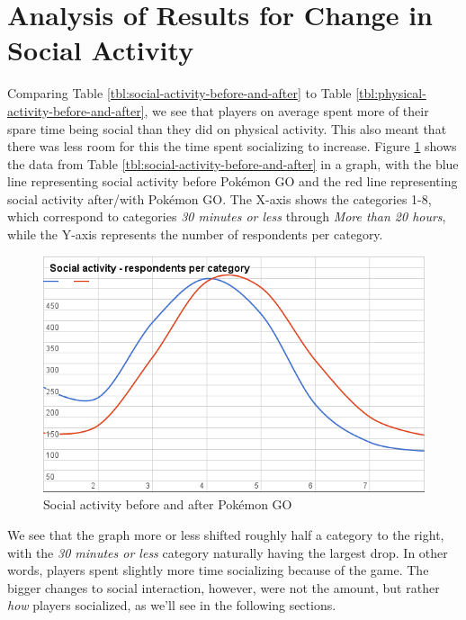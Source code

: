 \section{Analysis of Results for Change in Social Activity}

Comparing Table \ref{tbl:social-activity-before-and-after} to Table \ref{tbl:physical-activity-before-and-after}, we see that players on average spent more of their spare time being social than they did on physical activity. This also meant that there was less room for this the time spent socializing to increase. Figure \ref{fig:social-activity-graph} shows the data from Table \ref{tbl:social-activity-before-and-after} in a graph, with the blue line representing social activity before Pokémon GO and the red line representing social activity after/with Pokémon GO. The X-axis shows the categories 1-8, which correspond to categories \emph{30 minutes or less} through \emph{More than 20 hours}, while the Y-axis represents the number of respondents per category.

\begin{figure}[h]
	\centering
	\includegraphics[width=\textwidth]{Figures/social-activity-graph}
	\caption{Social activity before and after Pokémon GO}
	\label{fig:social-activity-graph}
\end{figure}

We see that the graph more or less shifted roughly half a category to the right, with the \emph{30 minutes or less} category naturally having the largest drop. In other words, players spent slightly more time socializing because of the game. The bigger changes to social interaction, however, were not the amount, but rather \emph{how} players socialized, as we'll see in the following sections.


